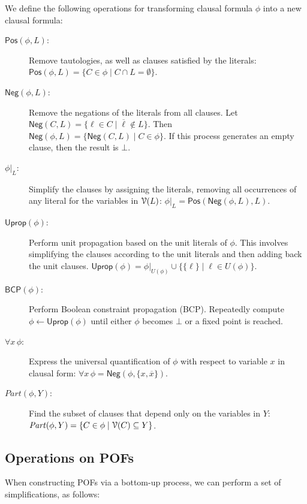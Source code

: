 \documentclass[letterpaper,USenglish,cleveref, autoref, thm-restate]{lipics-v2021}
\newcommand{\nil}{\bot}
\newcommand{\obar}[1]{\overline{#1}}
\newcommand{\lit}{\ell}
\newcommand{\dependencyset}{{\cal V}}
\newcommand{\simplify}[2]{#1|_{#2}}
\newcommand{\ureduce}[2]{\forall #2\, #1}
\newcommand{\partition}[2]{\mathit{Part}(#1, #2)}
\newcommand{\algo}[1]{\textsf{#1}}
\newcommand{\posop}{\algo{Pos}}
\newcommand{\negop}{\algo{Neg}}
\newcommand{\bcp}{\algo{BCP}}
\newcommand{\uprop}{\algo{Uprop}}
\begin{document}
We define the following operations for transforming clausal formula $\phi$ into a new clausal formula:
\begin{description}
\item[$\posop(\phi, L)$:] Remove tautologies, as well as clauses satisfied by the literals: $\posop(\phi, L) = \{ C \in \phi \mid  C \cap L = \emptyset\}$.

\item[$\negop(\phi, L)$:] Remove the negations of the literals from all clauses.  Let $\negop(C, L) = \{ \lit \in C \mid  \obar{\lit} \not \in L\}$.
  Then $\negop(\phi, L) = \{ \negop(C, L) \mid  C \in \phi \}$.  If this process generates an empty clause, then the result is $\nil$.

\item[$\simplify{\phi}{L}$:] Simplify the clauses by assigning the literals, removing all occurrences of any literal for the variables in $\dependencyset(L)$:
$\simplify{\phi}{L} = \posop(\negop(\phi, L), L)$. 

\item[$\uprop(\phi)$:]  Perform unit propagation based on the unit literals of $\phi$.  This involves simplifying the clauses according to the unit literals and then adding back the unit clauses.
$\uprop(\phi) = \simplify{\phi}{U(\phi)} \cup \{ \{\lit \} \mid  \lit \in U(\phi) \}$.

\item[$\bcp(\phi)$:] Perform Boolean constraint propagation (BCP).
  Repeatedly compute $\phi \leftarrow \uprop(\phi)$ until either $\phi$ becomes $\nil$ or a fixed point is reached.

\item[$\ureduce{\phi}{x}$:] Express the universal quantification of $\phi$ with respect to variable $x$ in clausal form:
$\ureduce{\phi}{x} = \negop(\phi, \{x, \obar{x}\})$.

\item[$\partition{\phi}{Y}$:] Find the subset of clauses that depend only on the variables in $Y$:
$\partition{\phi}{Y} = \{ C \in \phi \mid \dependencyset(C) \subseteq Y\}$.

\end{description}

\subsection{Operations on POFs}

When constructing POFs via a bottom-up process, we can perform a set of simplifications, as follows:
\end{document}
